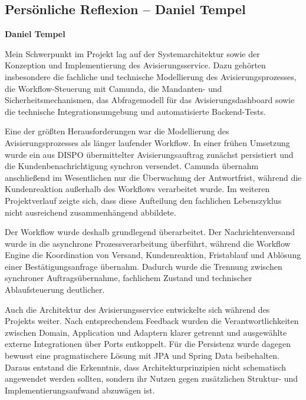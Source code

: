 \documentclass[
  12pt,
  a4paper,
  oneside
]{article}
\begin{document}
\tableofcontents
\clearpage

\setcounter{section}{8}

\subsection*{Persönliche Reflexion -- Daniel Tempel}

\noindent\textbf{Daniel Tempel}\par
\nopagebreak

Mein Schwerpunkt im Projekt lag auf der Systemarchitektur sowie der
Konzeption und Implementierung des Avisierungsservice. Dazu gehörten
insbesondere die fachliche und technische Modellierung des
Avisierungsprozesses, die Workflow-Steuerung mit Camunda, die
Mandanten- und Sicherheitsmechanismen, das Abfragemodell für das
Avisierungsdashboard sowie die technische Integrationsumgebung und
automatisierte Backend-Tests.

Eine der größten Herausforderungen war die Modellierung des
Avisierungsprozesses als länger laufender Workflow. In einer frühen
Umsetzung wurde ein aus DISPO übermittelter Avisierungsauftrag zunächst
persistiert und die Kundenbenachrichtigung synchron versendet. Camunda
übernahm anschließend im Wesentlichen nur die Überwachung der
Antwortfrist, während die Kundenreaktion außerhalb des Workflows
verarbeitet wurde. Im weiteren Projektverlauf zeigte sich, dass diese
Aufteilung den fachlichen Lebenszyklus nicht ausreichend zusammenhängend
abbildete.

Der Workflow wurde deshalb grundlegend überarbeitet. Der
Nachrichtenversand wurde in die asynchrone Prozessverarbeitung
überführt, während die Workflow Engine die Koordination von Versand,
Kundenreaktion, Fristablauf und Ablösung einer Bestätigungsanfrage
übernahm. Dadurch wurde die Trennung zwischen synchroner
Auftragsübernahme, fachlichem Zustand und technischer Ablaufsteuerung
deutlicher.

Auch die Architektur des Avisierungsservice entwickelte sich während
des Projekts weiter. Nach entsprechendem Feedback wurden die
Verantwortlichkeiten zwischen Domain, Application und Adaptern klarer
getrennt und ausgewählte externe Integrationen über Ports entkoppelt.
Für die Persistenz wurde dagegen bewusst eine pragmatischere Lösung mit
JPA und Spring Data beibehalten. Daraus entstand die Erkenntnis, dass
Architekturprinzipien nicht schematisch angewendet werden sollten,
sondern ihr Nutzen gegen zusätzlichen Struktur- und
Implementierungsaufwand abzuwägen ist.
\end{document}
